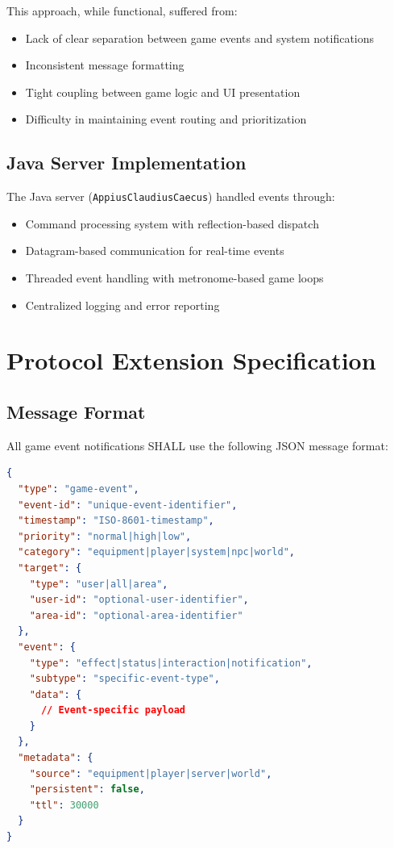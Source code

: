\documentclass[12pt,a4paper]{article}
\begin{document}
This approach, while functional, suffered from:
\begin{itemize}
\item Lack of clear separation between game events and system notifications
\item Inconsistent message formatting
\item Tight coupling between game logic and UI presentation
\item Difficulty in maintaining event routing and prioritization
\end{itemize}

\subsection{Java Server Implementation}

The Java server (\texttt{AppiusClaudiusCaecus}) handled events through:

\begin{itemize}
\item Command processing system with reflection-based dispatch
\item Datagram-based communication for real-time events
\item Threaded event handling with metronome-based game loops
\item Centralized logging and error reporting
\end{itemize}

\section{Protocol Extension Specification}

\subsection{Message Format}

All game event notifications SHALL use the following JSON message format:

\begin{lstlisting}[language=JSON, caption=Game Event Message Format]
{
  "type": "game-event",
  "event-id": "unique-event-identifier",
  "timestamp": "ISO-8601-timestamp",
  "priority": "normal|high|low",
  "category": "equipment|player|system|npc|world",
  "target": {
    "type": "user|all|area",
    "user-id": "optional-user-identifier",
    "area-id": "optional-area-identifier"
  },
  "event": {
    "type": "effect|status|interaction|notification",
    "subtype": "specific-event-type",
    "data": {
      // Event-specific payload
    }
  },
  "metadata": {
    "source": "equipment|player|server|world",
    "persistent": false,
    "ttl": 30000
  }
}
\end{lstlisting}
\end{document}
